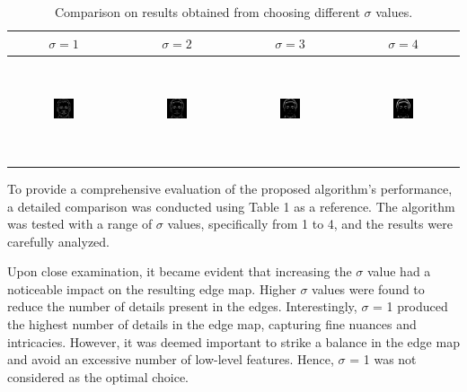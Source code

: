 \documentclass{70_styles/svproc}
\begin{document}
\begin{table}
\centering
\begin{tabular}{|c|c|c|c|}
    \hline
    $\sigma = 1$ & $\sigma = 2$ & $\sigma = 3$ & $\sigma = 4$ \\
    \hline
    \includegraphics[width=0.2\textwidth, height=30mm]{70_figures/thinned_sigma1-seed1830.png} &
    \includegraphics[width=0.2\textwidth, height=30mm]{70_figures/thinned-seed1830.png} &
    \includegraphics[width=0.2\textwidth, height=30mm]{70_figures/thinned_sigma3-seed1830.png} &
    \includegraphics[width=0.2\textwidth, height=30mm]{70_figures/thinned_sigma4-seed1830.png} \\
    \hline
\end{tabular}
\caption{Comparison on results obtained from choosing different $\sigma$ values.}
\end{table}


To provide a comprehensive evaluation of the proposed algorithm's performance, a detailed comparison was conducted using Table 1 as a reference. The algorithm was tested with a range of $\sigma$ values, specifically from 1 to 4, and the results were carefully analyzed.

Upon close examination, it became evident that increasing the $\sigma$ value had a noticeable impact on the resulting edge map. Higher $\sigma$ values were found to reduce the number of details present in the edges. Interestingly, $\sigma$ = 1 produced the highest number of details in the edge map, capturing fine nuances and intricacies. However, it was deemed important to strike a balance in the edge map and avoid an excessive number of low-level features. Hence, $\sigma$ = 1 was not considered as the optimal choice.
\end{document}
